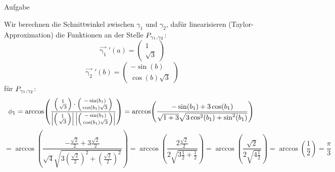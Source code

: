 \documentclass{scrartcl}
\begin{document}
\begin{section}{Aufgabe}
\begin{itemize}
\[\]
Wir berechnen die Schnittwinkel zwischen $\gamma_1$ und $\gamma_2$, dafür linearisieren (Taylor-Approximation) die Funktionen an der Stelle $\schnt{\gamma_1}{\gamma_2}{P}$:\\
\[\vec{\upgamma_1}'(a)=\begin{pmatrix}1\\\sqrt{3}\end{pmatrix}\]
\[\vec{\upgamma_2}'(b)=\begin{pmatrix}-\sin(b)\\\cos(b)\sqrt{3}\end{pmatrix}\]
für $\schnt{\gamma_1}{\gamma_2}{P}$:
\[\phi_1=\arccos(\frac{\begin{psmallmatrix}1\\\sqrt{3}\end{psmallmatrix}\cdot \begin{psmallmatrix}-\sin(b_1)\\\cos(b_1)\sqrt{3}\end{psmallmatrix}}{\left|\begin{psmallmatrix}1\\\sqrt{3}\end{psmallmatrix}\right|\left|\begin{psmallmatrix}-\sin(b_1)\\\cos(b_1)\sqrt{3}\end{psmallmatrix}\right|})
=\arccos(\frac{-\sin(b_1)+3\cos(b_1)}{\sqrt{1+3} \sqrt{3 \cos[2](b_1)+\sin[2](b_1)}})\]
\[=\arccos(\frac{-\frac{\sqrt{2}}{2}+3\frac{\sqrt{2}}{2}}{\sqrt{4} \sqrt{3 (\frac{\sqrt{2}}{2})^2+(\frac{\sqrt{2}}{2})^2}})=
\arccos(\frac{2\frac{\sqrt{2}}{2}}{2 \sqrt{3 \frac{1}{2}+\frac{1}{2}}})
=\arccos(\frac{\sqrt{2}}{2 \sqrt{4\frac{1}{2}}})
=\arccos(\frac{1}{2})=\frac{\pi}{3}\]


\end{itemize}
\end{section}
\end{document}
